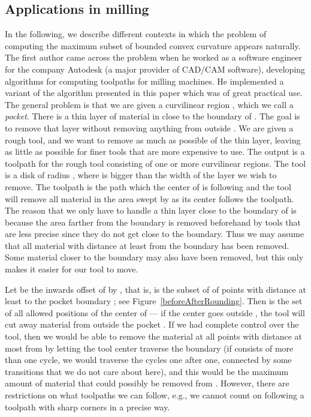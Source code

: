\documentclass{article}
\begin{document}
\subsection{Applications in milling}
In the following, we describe different contexts in which the problem of computing the maximum subset of bounded convex curvature appears naturally.
The first author came across the problem when he worked as a software engineer for the company Autodesk (a major provider of CAD/CAM software), developing algorithms for computing toolpaths for milling machines.
He implemented a variant of the algorithm presented in this paper which was of great practical use.
The general problem is that we are given a curvilinear region , which we call a \emph{pocket}.
There is a thin layer of material in  close to the boundary
 of . The goal is to remove that layer without removing anything from outside . We are given a rough
tool, and we want to remove as much as possible of the thin layer, leaving as little as
possible for finer tools that are more expensive to use. The output is
a toolpath for the rough tool consisting of one or more curvilinear
regions. The tool is a disk  of radius , where  is
bigger than the width of the layer we wish to remove.  The toolpath is
the path which the center of  is following and the tool will remove all material in the area swept by  as its center follows the toolpath.
The reason that we only have to handle a thin layer close to the boundary of  is because the area farther from the boundary is removed beforehand by tools
that are less precise since they do not get close to the boundary.
Thus we may assume that all material with distance at least  from the boundary has been removed.
Some material closer to the boundary may also have been removed, but this only makes it easier for our tool to move.

Let  be the inwards offset of  by , that is,  is the subset of  of points with distance at least  to the pocket boundary ; see Figure~\ref{beforeAfterRounding}.
Then  is the set of all allowed positions of the center of  --- if the center goes outside , the tool will cut away material from outside the pocket .
If we had complete control over the tool, then we would be able to remove the material at all points with distance at most  from  by letting the tool center traverse the boundary  (if  consists of more than one cycle, we would traverse the cycles one after one, connected by some transitions that we do not care about here), and this would be the maximum amount of material that could possibly be removed from .
However, there are restrictions on what toolpaths we can follow, e.g., we cannot count on following a toolpath with sharp corners in a precise way.
\end{document}
